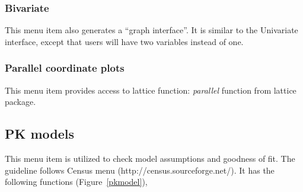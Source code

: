 \documentclass[a4paper]{article}
\begin{document}
\subsubsection{Bivariate}
This menu item also generates a ``graph interface''. It is similar to the Univariate interface, except that users will have two variables instead of one.
\subsubsection{Parallel coordinate plots}
This menu item provides access to lattice function: \textit{parallel} function from lattice package.
\subsection{PK models}
This menu item is utilized to check model assumptions and goodness of fit. The guideline follows Census menu (http://census.sourceforge.net/). It has the following functions (Figure~\ref{pkmodel}),
\end{document}
